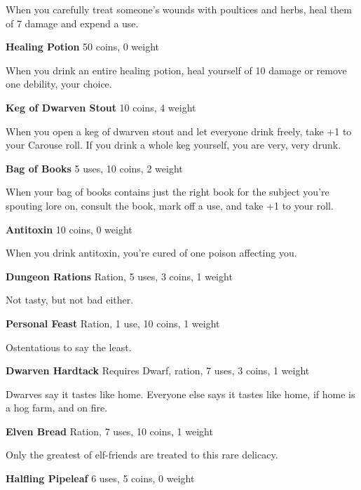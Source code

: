 When you carefully treat someone's wounds with poultices and herbs, heal them of 7 damage and expend a use.

{\noindent \bfseries Healing Potion} \hspace*{\fill} 50 coins, 0 weight

When you drink an entire healing potion, heal yourself of 10 damage or remove one debility, your choice.

{\noindent \bfseries Keg of Dwarven Stout} \hspace*{\fill} 10 coins, 4 weight

When you open a keg of dwarven stout and let everyone drink freely, take +1 to your Carouse roll. If you drink a whole keg yourself, you are very, very drunk.

{\noindent \bfseries Bag of Books} \hspace*{\fill} 5 uses, 10 coins, 2 weight

When your bag of books contains just the right book for the subject you're spouting lore on, consult the book, mark off a use, and take +1 to your roll.

{\noindent \bfseries Antitoxin} \hspace*{\fill} 10 coins, 0 weight

When you drink antitoxin, you're cured of one poison affecting you.

{\noindent \bfseries Dungeon Rations} \hspace*{\fill} Ration, 5 uses, 3 coins, 1 weight

Not tasty, but not bad either.

{\noindent \bfseries Personal Feast} \hspace*{\fill} Ration, 1 use, 10 coins, 1 weight

Ostentatious to say the least.

{\noindent \bfseries Dwarven Hardtack} \hspace*{\fill} Requires Dwarf, ration, 7 uses, 3 coins, 1 weight

Dwarves say it tastes like home. Everyone else says it tastes like home, if home is a hog farm, and on fire.

{\noindent \bfseries Elven Bread} \hspace*{\fill} Ration, 7 uses, 10 coins, 1 weight

Only the greatest of elf-friends are treated to this rare delicacy.

{\noindent \bfseries Halfling Pipeleaf} \hspace*{\fill} 6 uses, 5 coins, 0 weight

